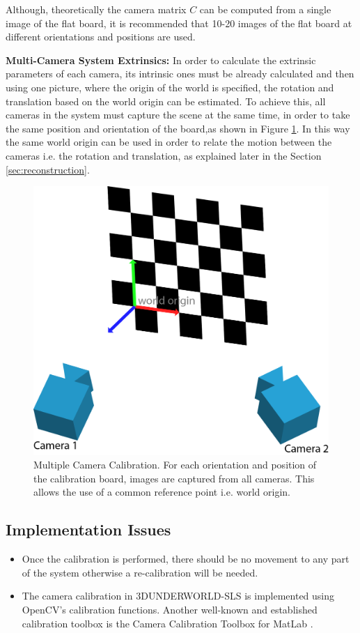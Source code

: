 \documentclass[final,12pt,3p]{elsarticle}
\begin{document}
Although, theoretically the camera matrix $C$ can be computed from a single image of the flat board, it is recommended that 10-20 images of the flat board at different orientations and positions are used. 

\textbf{Multi-Camera System Extrinsics:} In order to calculate the extrinsic parameters of each camera, its intrinsic ones must be already calculated and then using one picture, where the origin of the world is specified, the rotation and translation based on the world origin can be estimated. To achieve this, all cameras in the system must capture the scene at the same time, in order to take the same position and orientation of the board,as shown in Figure \ref{fig:calibration}. In this way the same world origin can be used in order to relate the motion between the cameras i.e. the rotation and translation, as explained later in the Section \ref{sec:reconstruction}.  

\begin{figure}[!ht]
	\centering
	\includegraphics[scale=0.6]{./images/extrCalib.png}
	\caption{\label{fig:calibration} Multiple Camera Calibration. For each orientation and position of the calibration board, images are captured from all cameras. This allows the use of a common reference point i.e. world origin.}
\end{figure}

\subsection{Implementation Issues}
\begin{itemize}
\item Once the calibration is performed, there should be no movement to any part of the system otherwise a re-calibration will be needed. 
\item The camera calibration in 3DUNDERWORLD-SLS is implemented using OpenCV's calibration functions. Another well-known and established calibration toolbox is the Camera Calibration Toolbox for MatLab \cite{bouguet2004camera}.
\end{itemize}
\end{document}
